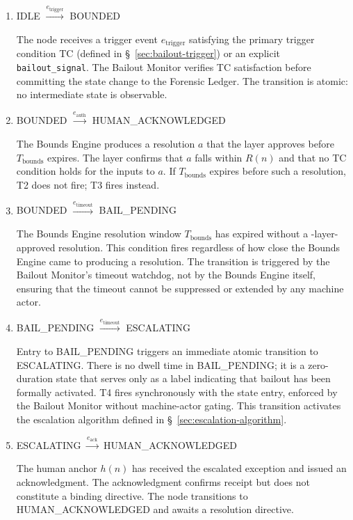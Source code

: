 \begin{enumerate}\itemsep=0pt
\item[T1.]\parbox{0.76\linewidth}{IDLE $\xrightarrow{e_{\text{trigger}}}$ BOUNDED} \label{t1}
The node receives a trigger event $e_{\text{trigger}}$ satisfying the primary trigger condition TC (defined in \S~\ref{sec:bailout-trigger}) or an explicit \texttt{bailout\_signal}. The Bailout Monitor verifies TC satisfaction before committing the state change to the Forensic Ledger. The transition is atomic: no intermediate state is observable.

\item[T2.]\parbox{0.76\linewidth}{BOUNDED $\xrightarrow{e_{\text{auth}}}$ HUMAN\_ACKNOWLEDGED} \label{t2}
The Bounds Engine produces a resolution $a$ that the \fact{} layer approves before $T_{\text{bounds}}$ expires. The \fact{} layer confirms that $a$ falls within $R(n)$ and that no TC condition holds for the inputs to $a$. If $T_{\text{bounds}}$ expires before such a resolution, T2 does not fire; T3 fires instead.

\item[T3.]\parbox{0.76\linewidth}{BOUNDED $\xrightarrow{e_{\text{timeout}}}$ BAIL\_PENDING} \label{t3}
The Bounds Engine resolution window $T_{\text{bounds}}$ has expired without a \fact-layer-approved resolution. This condition fires regardless of how close the Bounds Engine came to producing a resolution. The transition is triggered by the Bailout Monitor's timeout watchdog, not by the Bounds Engine itself, ensuring that the timeout cannot be suppressed or extended by any machine actor.

\item[T4.]\parbox{0.76\linewidth}{BAIL\_PENDING $\xrightarrow{e_{\text{timeout}}}$ ESCALATING} \label{t4}
Entry to BAIL\_PENDING triggers an immediate atomic transition to ESCALATING. There is no dwell time in BAIL\_PENDING; it is a zero-duration state that serves only as a label indicating that bailout has been formally activated. T4 fires synchronously with the state entry, enforced by the Bailout Monitor without machine-actor gating. This transition activates the escalation algorithm defined in \S~\ref{sec:escalation-algorithm}.

\item[T5.]\parbox{0.76\linewidth}{ESCALATING $\xrightarrow{e_{\text{ack}}}$ HUMAN\_ACKNOWLEDGED} \label{t5}
The human anchor $h(n)$ has received the escalated exception and issued an acknowledgment. The acknowledgment confirms receipt but does not constitute a binding directive. The node transitions to HUMAN\_ACKNOWLEDGED and awaits a resolution directive.


\end{enumerate}
